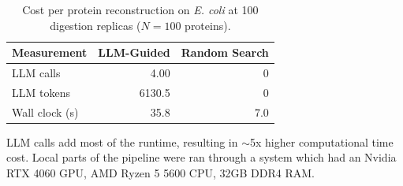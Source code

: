 \begin{table}[!tb]
  \centering
  \caption{Cost per protein reconstruction on \textnormal{\textnormal{\textit{E. coli}}} at 100 digestion replicas ($N=100$ proteins).}
  \label{tab:cost_ecoli_r100}
  \small
  \setlength{\tabcolsep}{4pt}
  \begin{tabular}{@{}lrr@{}}
    \toprule
    Measurement & LLM-Guided & Random Search \\
    \midrule
    LLM calls & 4.00 & 0 \\
    LLM tokens & 6130.5 & 0 \\
    Wall clock (s) & 35.8 & 7.0 \\
    \bottomrule
  \end{tabular}
  \par\smallskip\footnotesize{LLM calls add most of the runtime, resulting in $\sim$5x higher computational time cost. Local parts of the pipeline were ran through
  a system which had an Nvidia RTX 4060 GPU, AMD Ryzen 5 5600 CPU, 32GB DDR4 RAM.}
\end{table}
